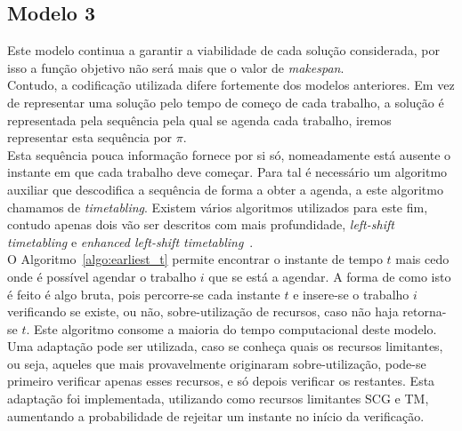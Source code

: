 \subsection{Modelo 3}

Este modelo continua a garantir a viabilidade de cada solução considerada, por isso a função objetivo não será mais que o valor de \textit{makespan}.\\
Contudo, a codificação utilizada difere fortemente dos modelos anteriores. Em vez de representar uma solução pelo tempo de começo de cada trabalho, a solução é representada pela sequência pela qual se agenda cada trabalho, iremos representar esta sequência por $\pi$.\\
Esta sequência pouca informação fornece por si só, nomeadamente está ausente o instante em que cada trabalho deve começar. Para tal é necessário um algoritmo auxiliar que descodifica a sequência de forma a obter a agenda, a este algoritmo chamamos de \textit{timetabling}. Existem vários algoritmos utilizados para este fim, contudo apenas dois vão ser descritos com mais profundidade, \textit{left-shift timetabling} e \textit{enhanced left-shift timetabling}~\cite{dengPopulationbasedIteratedGreedy2020}.\\

O Algoritmo~\ref{algo:earliest_t} permite encontrar o instante de tempo $t$ mais cedo onde é possível agendar o trabalho $i$ que se está a agendar. A forma de como isto é feito é algo bruta, pois percorre-se cada instante $t$ e insere-se o trabalho $i$ verificando se existe, ou não, sobre-utilização de recursos, caso não haja retorna-se $t$. Este algoritmo consome a maioria do tempo computacional deste modelo.\\
Uma adaptação pode ser utilizada, caso se conheça quais os recursos limitantes, ou seja, aqueles que mais provavelmente originaram sobre-utilização, pode-se primeiro verificar apenas esses recursos, e só depois verificar os restantes. Esta adaptação foi implementada, utilizando como recursos limitantes SCG e TM, aumentando a probabilidade de rejeitar um instante no início da verificação.\\

